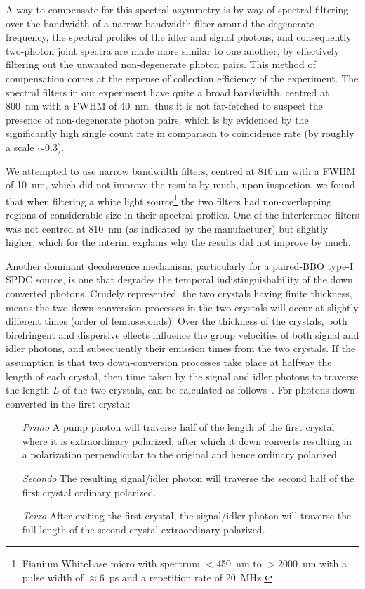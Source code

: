 \bigskip
\noindent
A way to compensate for this spectral asymmetry is by way of spectral filtering over the bandwidth of a narrow bandwidth filter around the degenerate frequency, the spectral profiles of the idler and signal photons, and consequently two-photon joint spectra are made more similar to one another, by effectively filtering out the unwanted non-degenerate photon pairs. This method of compensation comes at the expense of collection efficiency of the experiment. The spectral filters in our experiment have quite a broad bandwidth, centred at \SI{800}{\nano\meter} with a \acs{FWHM} of \SI{40}{\nano\meter}, thus it is not far-fetched to suspect the presence of non-degenerate photon pairs, which is by evidenced by the significantly high single count rate in comparison to coincidence rate (by roughly a scale $\sim 0.3$). 

\clearpage
\noindent
We attempted to use narrow bandwidth filters, centred at $\SI{810}{\nano\meter}$ with a \acs{FWHM} of \SI{10}{\nano\meter}, which did not improve the results by much, upon inspection, we found that when filtering a white light source\footnote{Fianium WhiteLase micro with spectrum $<$\SI{450}{nm} to $>$\SI{2000}{nm} with a pulse width of $\approx$\SI{6}{ps} and a repetition rate of \SI{20}{MHz}.} the two filters had non-overlapping regions of considerable size in their spectral profiles. One of the interference filters was not centred at \SI{810}{\nano\meter} (as indicated by the manufacturer) but slightly higher, which for the interim explains why the results did not improve by much.

\bigskip
\noindent
Another dominant decoherence mechanism, particularly for a paired-\acs{BBO} type-I \acs{SPDC} source, is one that degrades the temporal indistinguishability of the down converted photons. Crudely represented, the two crystals having finite thickness, means the two down-conversion processes in the two crystals will occur at slightly different times (order of femtoseconds). Over the thickness of the crystals, both birefringent and dispersive effects influence the group velocities of both signal and idler photons, and subsequently their emission times from the two crystals. If the assumption is that two down-conversion processes take place at halfway the length of each crystal, then time taken by the signal and idler photons to traverse the length $L$ of the two crystals, can be calculated as follows~\cite{Rangarajan_2009}.  For photons down converted in the first crystal:

\begin{itemize}
	\item[\emph{Primo}] A pump photon will traverse half of the length of the first crystal where it is extraordinary polarized, after which it down converts resulting in a polarization perpendicular to the original and hence ordinary polarized. 
	\item[\emph{Secondo}] The resulting signal/idler photon will traverse the second half of the first crystal ordinary polarized.
	\item[\emph{Terzo}] After exiting the first crystal, the signal/idler photon will traverse the full length of the second crystal extraordinary polarized.
\end{itemize}

